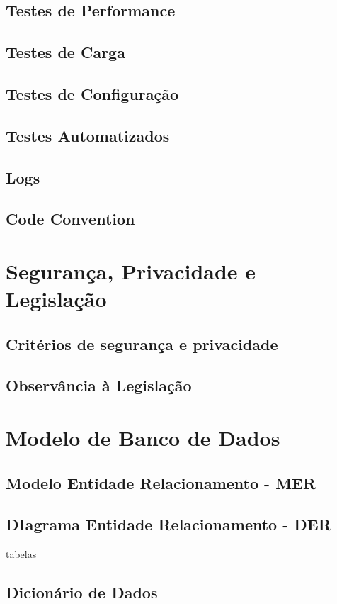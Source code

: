 \documentclass[
12pt,				%
openright,			%
twoside,			%
a4paper,			%
english,			%
french,				%
spanish,			%
brazil				%
]{abntex2}
\begin{document}
	\subsection{Testes de Performance}
	\subsection{Testes de Carga}
	\subsection{Testes de Configuração}
	\subsection{Testes Automatizados}
	\subsection{Logs}
	\subsection{Code Convention}
	\section{Segurança, Privacidade e Legislação}
	\subsection{Critérios de segurança e privacidade}
	\subsection{Observância à Legislação}
	\section{Modelo de Banco de Dados}
	\subsection{Modelo Entidade Relacionamento - MER}
	\subsection{DIagrama Entidade Relacionamento - DER}
	tabelas
	\subsection{Dicionário de Dados}
\end{document}
